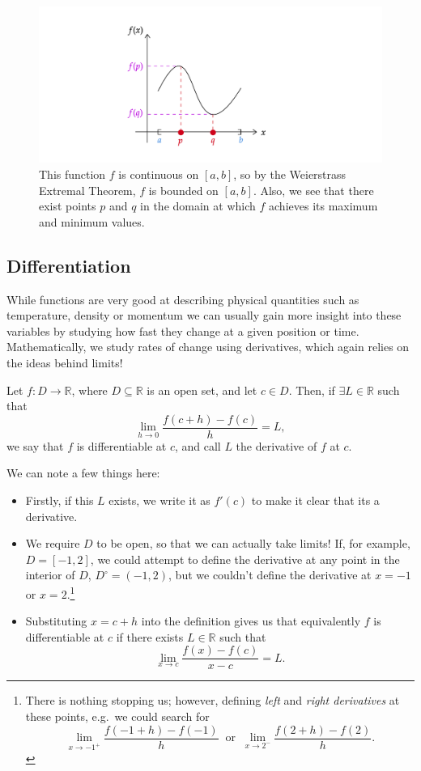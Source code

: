 \documentclass[
  10pt,
  a4paper]{article}
\providecommand{\tightlist}{%
  \setlength{\itemsep}{0pt}\setlength{\parskip}{0pt}}
\theoremstyle{plain}
\theoremstyle{definition}
\theoremstyle{plain}
\theoremstyle{plain}
\theoremstyle{plain}
\theoremstyle{plain}
\theoremstyle{definition}
\theoremstyle{definition}
\theoremstyle{remark}
\theoremstyle{remark}
\let\BeginKnitrBlock\begin \let\EndKnitrBlock\end
\begin{document}
\begin{figure}
\includegraphics{WET} \caption{This function $f$ is continuous on $[a,b]$, so by the Weierstrass Extremal Theorem, $f$ is bounded on $[a,b]$. Also, we see that there exist points $p$ and $q$ in the domain at which $f$ achieves its maximum and minimum values.}\label{fig:wet}
\end{figure}

\hypertarget{differentiation}{%
\subsection{Differentiation}\label{differentiation}}

While functions are very good at describing physical quantities such as temperature, density or momentum we can usually gain more insight into these variables by studying how fast they change at a given position or time. Mathematically, we study rates of change using derivatives, which again relies on the ideas behind limits!

\BeginKnitrBlock{definition}[Derivative]
{\label{def:def2} }Let \(f: D \to \mathbb{R}\), where \(D \subseteq \mathbb{R}\) is an open set, and let \(c \in D\). Then, if \(\exists L \in \mathbb{R}\) such that \[\lim_{h \to 0}\frac{f(c+h) - f(c)}{h} = L,\] we say that \(f\) is differentiable at \(c\), and call \(L\) the derivative of \(f\) at \(c\).
\EndKnitrBlock{definition}
We can note a few things here:

\begin{itemize}
\tightlist
\item
  Firstly, if this \(L\) exists, we write it as \(f'(c)\) to make it clear that its a derivative.
\item
  We require \(D\) to be open, so that we can actually take limits! If, for example, \(D = [-1,2]\), we could attempt to define the derivative at any point in the interior of \(D\), \(D^{\circ} = (-1,2)\), but we couldn't define the derivative at \(x = -1\) or \(x = 2\).\footnote{There is nothing stopping us; however, defining \emph{left} and \emph{right derivatives} at these points, e.g.~we could search for \[\lim_{x \to -1^{+}}\frac{f(-1+h) - f(-1)}{h}\;\;\text{or}\;\;\lim_{x \to 2^{-}}\frac{f(2+h) - f(2)}{h}.\]}
\item
  Substituting \(x = c+h\) into the definition gives us that equivalently \(f\) is differentiable at \(c\) if there exists \(L\in\mathbb{R}\) such that \[\lim_{x \to c}\frac{f(x) - f(c)}{x - c} = L.\]
\end{itemize}
\end{document}
